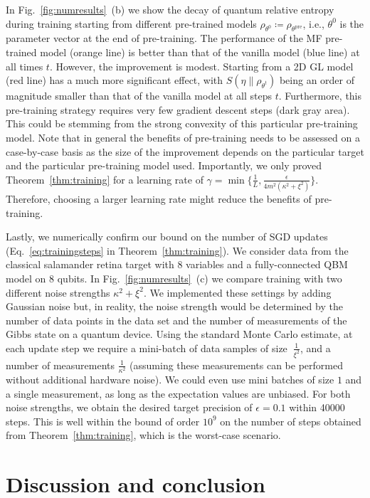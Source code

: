 \documentclass[
    aps,
    prx,
    floatfix,
    nofootinbib,
    onecolumn
]{revtex4-2}
\begin{document}
In Fig.~\ref{fig:numresults}~(b) we show the decay of quantum relative entropy during training starting from different pre-trained models $\rho_{\theta^0} \coloneqq \rho_{\theta^\mathrm{pre}}$, i.e., $\theta^0$ is the parameter vector at the end of pre-training. The performance of the MF pre-trained model (orange line) is better than that of the vanilla model (blue line) at all times $t$. However, the improvement is modest. Starting from a 2D GL model (red line) has a much more significant effect, with $S(\eta \|\rho_{\theta^t})$ being an order of magnitude smaller than that of the vanilla model at all steps $t$. Furthermore, this pre-training strategy requires very few gradient descent steps (dark gray area). This could be stemming from the strong convexity of this particular pre-training model. Note that in general the benefits of pre-training needs to be assessed on a case-by-case basis as the size of the improvement depends on the particular target and the particular pre-training model used. Importantly, we only proved Theorem~\ref{thm:training} for a learning rate of $\gamma = \min \{ \frac{1}{L}, \frac{\epsilon}{4m^2(\kappa^2 +\xi^2)}\}$. Therefore, choosing a larger learning rate might reduce the benefits of pre-training. 

Lastly, we numerically confirm our bound on the number of SGD updates (Eq.~\eqref{eq:trainingsteps} in Theorem~\ref{thm:training}). We consider data from the classical salamander retina target with $8$ variables and a fully-connected QBM model on $8$ qubits. 
In Fig.~\ref{fig:numresults}~(c) we compare training with two different noise strengths $\kappa^2+\xi^2$. We implemented these settings by adding Gaussian noise but, in reality, the noise strength would be determined by the number of data points in the data set and the number of measurements of the Gibbs state on a quantum device. Using the standard Monte Carlo estimate, at each update step we require a mini-batch of data samples of size $~\frac{1}{\xi^2}$, and a number of measurements $\frac{1}{\kappa^2}$ (assuming these measurements can be performed without additional hardware noise). We could even use mini batches of size $1$ and a single measurement, as long as the expectation values are unbiased. For both noise strengths, we obtain the desired target precision of $\epsilon=0.1$ within 40000 steps. This is well within the bound of order $10^9$ on the number of steps obtained from Theorem~\ref{thm:training}, which is the worst-case scenario.

\section*{Discussion and conclusion}
\end{document}
